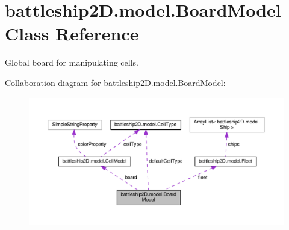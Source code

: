 \hypertarget{classbattleship2D_1_1model_1_1BoardModel}{\section{battleship2\-D.\-model.\-Board\-Model Class Reference}
\label{classbattleship2D_1_1model_1_1BoardModel}
}


Global board for manipulating cells.  




Collaboration diagram for battleship2\-D.\-model.\-Board\-Model\-:\nopagebreak
\begin{figure}[H]
\begin{center}
\leavevmode
\includegraphics[width=350pt]{classbattleship2D_1_1model_1_1BoardModel__coll__graph}
\end{center}
\end{figure}
